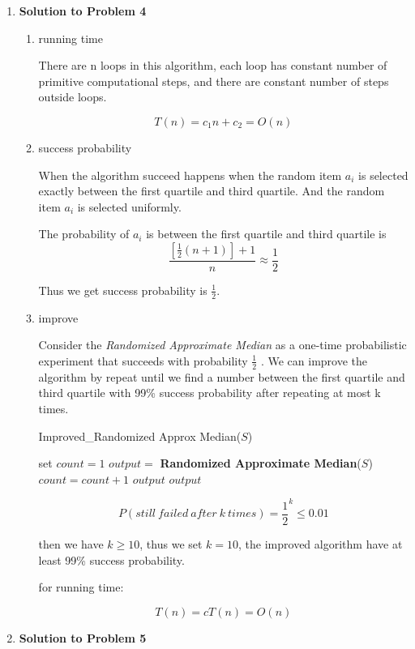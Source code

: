 \documentclass[11pt]{article}
\begin{document}
\begin{enumerate}
\item \textbf{Solution to Problem 4}


\begin{enumerate}
\item  running time
\

There are n loops in this algorithm, each loop has constant number of primitive computational steps, and there are constant number of steps outside loops. 

$$T(n)=c_1n+c_2=O(n)$$

\item success probability
\

When the algorithm succeed happens when the random item $a_i$ is selected exactly between the first quartile and third quartile. And the random item $a_i$ is selected uniformly.

The probability of $a_i$ is between the first quartile and third quartile is
$$\frac{[\frac{1}{2}(n+1)]+1}{n}\approx \frac{1}{2}$$

Thus we get success probability is $\frac{1}{2}$.

\item improve

Consider the \textit{
Randomized Approximate Median} as a one-time probabilistic experiment that succeeds with probability $\frac{1}{2}$ . We can improve the algorithm by repeat until we find a number between the first quartile and third quartile with 99\% success probability after repeating at most k times. 

	\begin{algorithm}[H]
    \caption{Improved\_Randomized Approx Median($S$)}	
    \begin{algorithmic}
    \State set $count=1$
     \State $output = $ \textbf{Randomized Approximate Median}($S$)
     \State $count = count+1$
     \State \Return $output$
     \EndIf
    \EndWhile
    \State \Return $output$
    \end{algorithmic}
    \end{algorithm}
    
$$P(still\ failed\ after\ k\ times)=\frac{1}{2}^k\leq0.01$$

then we have $k \geq 10$, thus we set $k=10$, the improved algorithm have at least 99\% success probability.

for running time:

$$T(n)=cT(n)=O(n)$$

\end{enumerate}
\item \textbf{Solution to Problem 5}


\end{enumerate}
\end{document}
